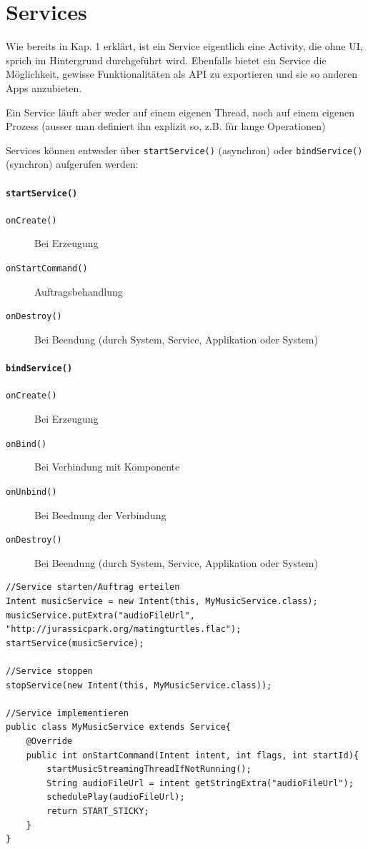 \documentclass[a4paper, 11pt]{article}
\newcommand{\code}[1]{\texttt{#1}}
\begin{document}
\section{Services}
Wie bereits in Kap. 1 erklärt, ist ein Service eigentlich eine Activity, die ohne UI, sprich im Hintergrund durchgeführt wird. Ebenfalls bietet ein Service die Möglichkeit, gewisse Funktionalitäten als API zu exportieren und sie so anderen Apps anzubieten.

Ein Service läuft aber weder auf einem eigenen Thread, noch auf einem eigenen Prozess (ausser man definiert ihn explizit so, z.B. für lange Operationen)
\vspace{10px}

\noindent Services können entweder über \code{startService()} (asynchron) oder \code{bindService()} (synchron) aufgerufen werden:

\begin{multicols}{2}
	\paragraph{\code{startService()}}
	\begin{description}
		\item[\code{onCreate()}] Bei Erzeugung
		\item[\code{onStartCommand()}] Auftragsbehandlung
		\item[\code{onDestroy()}] Bei Beendung (durch System, Service, Applikation oder System)
	\end{description}
\columnbreak
	\paragraph{\code{bindService()}}
	\begin{description}
		\item[\code{onCreate()}] Bei Erzeugung
		\item[\code{onBind()}] Bei Verbindung mit Komponente
		\item[\code{onUnbind()}] Bei Beednung der Verbindung
		\item[\code{onDestroy()}] Bei Beendung (durch System, Service, Applikation oder System)
	\end{description}
\end{multicols}

\begin{lstlisting}[caption={}]
//Service starten/Auftrag erteilen
Intent musicService = new Intent(this, MyMusicService.class);
musicService.putExtra("audioFileUrl", "http://jurassicpark.org/matingturtles.flac");
startService(musicService);

//Service stoppen
stopService(new Intent(this, MyMusicService.class));

//Service implementieren
public class MyMusicService extends Service{
	@Override
	public int onStartCommand(Intent intent, int flags, int startId){
		startMusicStreamingThreadIfNotRunning();
		String audioFileUrl = intent getStringExtra("audioFileUrl");
		schedulePlay(audioFileUrl);
		return START_STICKY;
	}
}
\end{lstlisting}
\end{document}

